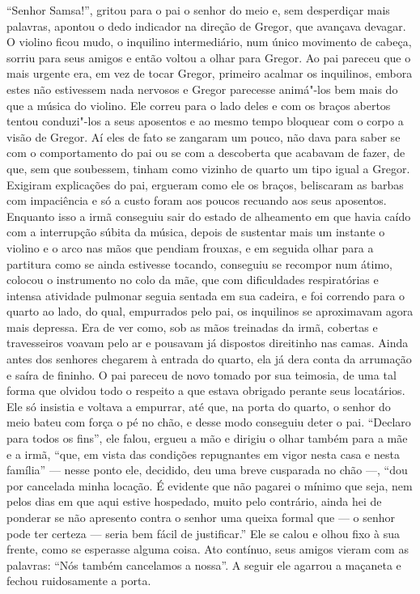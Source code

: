 “Senhor Samsa!”, gritou para o pai o senhor do meio e, sem desperdiçar
mais palavras, apontou o dedo indicador na direção de Gregor, que avançava
devagar. O violino ficou mudo, o inquilino intermediário, num único
movimento de cabeça, sorriu para seus amigos e então voltou a olhar para
Gregor. Ao pai pareceu que o mais urgente era, em vez de tocar Gregor,
primeiro acalmar os inquilinos, embora estes não estivessem nada nervosos
e Gregor parecesse animá"-los bem mais do que a música do violino. Ele
correu para o lado deles e com os braços abertos tentou conduzi"-los a seus
aposentos e ao mesmo tempo bloquear com o corpo a visão de Gregor. Aí eles
de fato se zangaram um pouco, não dava para saber se com o comportamento
do pai ou se com a descoberta que acabavam de fazer, de que, sem que
soubessem, tinham como vizinho de quarto um tipo igual a Gregor. Exigiram
explicações do pai, ergueram como ele os braços, beliscaram as barbas com
impaciência e só a custo foram aos poucos recuando aos seus aposentos.
Enquanto isso a irmã conseguiu sair do estado de alheamento em que havia
caído com a interrupção súbita da música, depois de sustentar mais um
instante o violino e o arco nas mãos que pendiam frouxas, e em seguida
olhar para a partitura como se ainda estivesse tocando, conseguiu se recompor
num átimo, colocou o instrumento no colo da mãe, que com dificuldades
respiratórias e intensa atividade pulmonar seguia sentada em sua cadeira,
e foi correndo para o quarto ao lado, do qual, empurrados pelo pai, os
inquilinos se aproximavam agora mais depressa. Era de ver como, sob as
mãos treinadas da irmã, cobertas e travesseiros voavam pelo ar e pousavam
já dispostos direitinho nas camas. Ainda antes dos senhores chegarem à
entrada do quarto, ela já dera conta da arrumação e saíra de fininho. O
pai pareceu de novo tomado por sua teimosia, de uma tal forma que olvidou
todo o respeito a que estava obrigado perante seus locatários. Ele só
insistia e voltava a empurrar, até que, na porta do quarto, o senhor do
meio bateu com força o pé no chão, e desse modo conseguiu deter o pai.
“Declaro para todos os fins”, ele falou, ergueu a mão e dirigiu o olhar
também para a mãe e a irmã, “que, em vista das condições repugnantes em
vigor nesta casa e nesta família” --- nesse ponto ele, decidido, deu uma
breve cusparada no chão ---, “dou por cancelada minha locação. É evidente
que não pagarei o mínimo que seja, nem pelos dias em que aqui estive
hospedado, muito pelo contrário, ainda hei de ponderar se não apresento
contra o senhor uma queixa formal que --- o senhor pode ter certeza --- seria
bem fácil de justificar.” Ele se calou e olhou fixo à sua frente, como se
esperasse alguma coisa. Ato contínuo, seus amigos vieram com as palavras:
“Nós também cancelamos a nossa”. A seguir ele agarrou a maçaneta e fechou
ruidosamente a porta.

